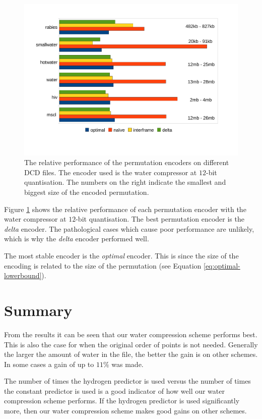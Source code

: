 \documentclass[a4paper]{report}
\begin{document}
\begin{figure}[h]
\centering
\includegraphics[trim = 10mm 30mm 10mm 18mm, clip, width=\textwidth]{images/perm}
\caption{The relative performance of the permutation encoders on different DCD
  files. The encoder used is the water compressor at $12$-bit
  quantisation. The numbers on the right indicate the smallest and biggest
  size of the encoded permutation.}
\label{fig:perm}
\end{figure}

Figure \ref{fig:perm} shows the relative performance of each permutation
encoder with the water compressor at $12$-bit quantisation. The best
permutation encoder is the \emph{delta} encoder. The pathological cases which
cause poor performance are unlikely, which is why the \emph{delta} encoder
performed well.

The most stable encoder is the \emph{optimal} encoder. This is since the size
of the encoding is related to the size of the permutation (see Equation
\ref{eq:optimal-lowerbound}).


\section{Summary}
\label{sec:summary}

From the results it can be seen that our water compression scheme performs
best. This is also the case for when the original order of points is not
needed. Generally the larger the amount of water in the file, the better the
gain is on other schemes. In some cases a gain of up to $11\%$ was made.

The number of times the hydrogen predictor is used versus the number of times
the constant predictor is used is a good indicator of how well our water
compression scheme performs. If the hydrogen predictor is used significantly
more, then our water compression scheme makes good gains on other schemes.
\end{document}
